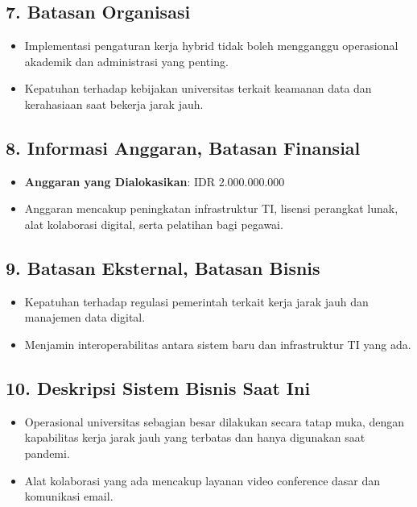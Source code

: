 \subsection*{7. Batasan Organisasi}
\begin{itemize}
	\item Implementasi pengaturan kerja hybrid tidak boleh mengganggu operasional akademik dan administrasi yang penting.
	\item Kepatuhan terhadap kebijakan universitas terkait keamanan data dan kerahasiaan saat bekerja jarak jauh.
\end{itemize}

\subsection*{8. Informasi Anggaran, Batasan Finansial}
\begin{itemize}
	\item \textbf{Anggaran yang Dialokasikan}: IDR 2.000.000.000
	\item Anggaran mencakup peningkatan infrastruktur TI, lisensi perangkat lunak, alat kolaborasi digital, serta pelatihan bagi pegawai.
\end{itemize}

\subsection*{9. Batasan Eksternal, Batasan Bisnis}
\begin{itemize}
	\item Kepatuhan terhadap regulasi pemerintah terkait kerja jarak jauh dan manajemen data digital.
	\item Menjamin interoperabilitas antara sistem baru dan infrastruktur TI yang ada.
\end{itemize}

\subsection*{10. Deskripsi Sistem Bisnis Saat Ini}
\begin{itemize}
	\item Operasional universitas sebagian besar dilakukan secara tatap muka, dengan kapabilitas kerja jarak jauh yang terbatas dan hanya digunakan saat pandemi.
	\item Alat kolaborasi yang ada mencakup layanan video conference dasar dan komunikasi email.
\end{itemize}

